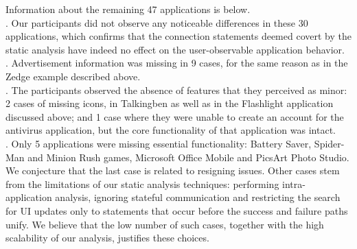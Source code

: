 
Information about the remaining 47 applications is below.
\\
{}.
Our participants did not observe any noticeable differences in these 30 applications, which confirms  
that the connection statements deemed covert by the static analysis have indeed no effect on the user-observable application behavior. 
\\
. 
Advertisement information was missing in 9 cases, for the same reason as in the Zedge example described above. 
\\
. 
The participants observed the absence of features that they perceived as minor: 2 cases of missing icons, in Talkingben as well as in the Flashlight application discussed above; and 1 case where they were unable to create an account for the antivirus application, but the core functionality of that application was intact. 
\\
.
Only 5 applications were missing essential functionality: %
Battery Saver, Spider-Man and Minion Rush games, Microsoft Office Mobile and PicsArt Photo Studio. We conjecture that the last case is related to resigning issues. %
Other cases stem from the limitations of our static analysis techniques: performing intra-application analysis, ignoring stateful communication and restricting the search for UI updates only to statements that occur before the success and failure paths unify.
We believe that the low number of such cases, together with the high scalability of our analysis, justifies these choices.   


